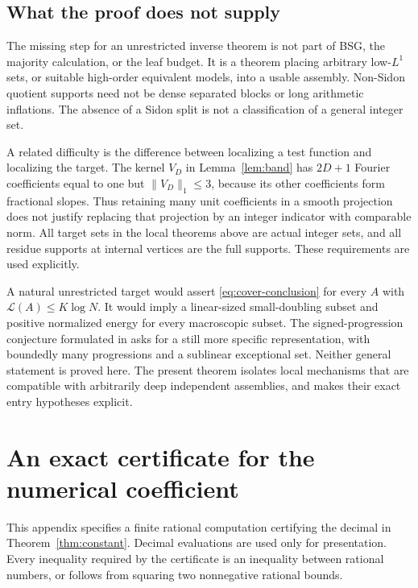 \documentclass[11pt,reqno]{amsart}
\numberwithin{equation}{section}
\theoremstyle{definition}
\theoremstyle{remark}
\newcommand{\La}{\mathcal L}
\newcommand{\norm}[1]{\lVert#1\rVert}
\begin{document}
\subsection{What the proof does not supply}

The missing step for an unrestricted inverse theorem is not part of
BSG, the majority calculation, or the leaf budget. It is a theorem
placing arbitrary low-$L^1$ sets, or suitable high-order equivalent
models, into a usable assembly. Non-Sidon quotient supports need not
be dense separated blocks or long arithmetic inflations. The absence
of a Sidon split is not a classification of a general integer set.

A related difficulty is the difference between localizing a test
function and localizing the target. The kernel $V_D$ in
Lemma~\ref{lem:band} has $2D+1$ Fourier coefficients equal to one but
$\norm{V_D}_1\le3$, because its other coefficients form fractional
slopes. Thus retaining many unit coefficients in a smooth projection
does not justify replacing that projection by an integer indicator
with comparable norm. All target sets in the local theorems above
are actual integer sets, and all residue supports at internal vertices
are the full supports. These requirements are used explicitly.

A natural unrestricted target would assert
\eqref{eq:cover-conclusion} for every $A$ with
$\La(A)\le K\log N$. It would imply a linear-sized small-doubling
subset and positive normalized energy for every macroscopic subset.
The signed-progression conjecture formulated in \cite[Section 6]{BG}
asks for a still more specific representation, with boundedly many
progressions and a sublinear exceptional set. Neither general statement
is proved here. The present theorem isolates local mechanisms that
are compatible with arbitrarily deep independent assemblies, and
makes their exact entry hypotheses explicit.

\appendix

\section{An exact certificate for the numerical coefficient}
\label{app:certificate}

This appendix specifies a finite rational computation certifying the
decimal in Theorem~\ref{thm:constant}. Decimal evaluations are used only
for presentation. Every inequality required by the certificate is an
inequality between rational numbers, or follows from squaring two
nonnegative rational bounds.
\end{document}
